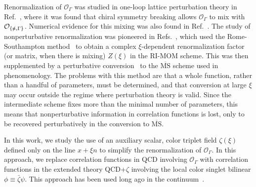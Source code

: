 \documentclass[prl,reprint,notitlepage,nofootinbib]{revtex4-1}
\newcommand{\cO}{\mathcal{O}}
\newcommand{\MSbar}{\overline{\text{MS}}}
\begin{document}
Renormalization of $\cO_\Gamma$ was studied in one-loop lattice
perturbation theory in Ref.~\cite{Constantinou:2017sej}, where it was
found that chiral symmetry breaking allows $\cO_\Gamma$ to mix with
$\cO_{\{\slashed{n},\Gamma\}}$. Numerical evidence for this mixing was
also found in Ref.~\cite{Yoon:2017qzo}.
The study of nonperturbative renormalization was pioneered in
Refs.~\cite{Alexandrou:2017huk,Chen:2017mzz}, which used the
Rome-Southampton method~\cite{Martinelli:1994ty} to obtain a complex
$\xi$-dependent renormalization factor (or matrix, when there is
mixing) $Z(\xi)$ in the RI-MOM scheme. This was then supplemented by a
perturbative conversion~\cite{Constantinou:2017sej}
to the $\MSbar$ scheme used in
phenomenology. The problems with this method are that a whole
function, rather than a handful of parameters, must be determined, and
that conversion at large $\xi$ may occur outside the regime where
perturbation theory is valid. Since the intermediate scheme fixes more
than the minimal number of parameters, this means that nonperturbative
information in correlation functions is lost, only to be recovered
perturbatively in the conversion to $\MSbar$.

In this work, we study the use of an auxiliary scalar, color triplet
field $\zeta(\xi)$ defined only on the line $x+\xi n$ to simplify the
renormalization of $\cO_\Gamma$. In this approach, we replace
correlation functions in QCD involving $\cO_\Gamma$ with correlation
functions in the extended theory QCD+$\zeta$ involving the local color
singlet bilinear $\phi\equiv \bar\zeta\psi$. This approach has been
used long ago in the continuum~\cite{Craigie:1980qs,Dorn:1986dt}.
\end{document}
